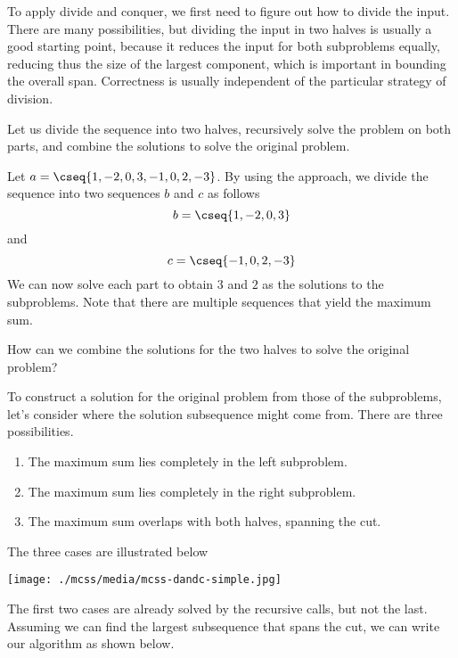 \begin{flex}
\begin{gram}
To apply divide and conquer, we first need to figure out how to divide the input.
%
There are many possibilities, but dividing the input in two halves is
usually a good starting point, because it reduces the input for both
subproblems equally, reducing thus the size of the largest component,
which is important in bounding the overall span.
%
Correctness is usually independent of the particular strategy of
division.
%

Let us divide the sequence into two halves, recursively solve the
problem on both parts, and combine the solutions to solve the original
problem.
\end{gram}

\begin{example}
\label{ex:mcss1}
Let $a = \cseq{1, -2, 0, 3, -1, 0, 2, -3}$.  By using the approach, we
divide the sequence into two sequences $b$ and $c$ as follows
\[
b = \cseq{1, -2, 0, 3}
\]
and
\[
c = \cseq{-1, 0, 2, -3}
\]
%
We can now solve each part to obtain $3$ and $2$ as the solutions to
the subproblems.
%
Note that there are multiple sequences that yield the maximum sum.  
\end{example}
\end{flex}

\begin{teachask}
How can we combine the solutions for the two halves to solve the
original problem?
\end{teachask}
%

\begin{gram}
To construct a solution for the original problem from those of the
subproblems, let's consider where the solution subsequence might come
from.  There are three possibilities.
\begin{enumerate}
\item  
The maximum sum lies completely in the left subproblem.

\item 
The maximum sum lies completely in the right subproblem.

\item
The maximum sum overlaps with both halves, spanning the cut.
\end{enumerate}

The three cases are illustrated below

\begin{center}
\texttt{[image: ./mcss/media/mcss-dandc-simple.jpg]}
\end{center}

The first two cases are already solved by the recursive calls, but not
the last.  Assuming we can find the largest subsequence that spans the
cut, we can write our algorithm as shown below.
\end{gram}


